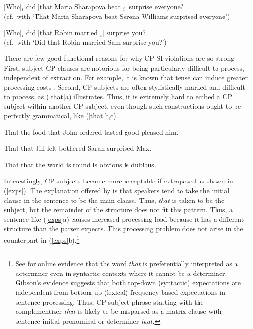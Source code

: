 \documentclass[output=paper]{langsci/langscibook}
\begin{document}
\ea
\ea \bad{*}[Who]$_i$ did [that Maria Sharapova beat \spc$_i$] surprise everyone?\\
(cf.\ with `That Maria Sharapova beat Serena Williams surprised everyone')

\ex \bad{*}[Who]$_i$ did [that Robin married \spc$_i$] surprise you?\\
(cf.\ with `Did that Robin married Sam surprise you?')
\z \label{ssc}
\z

%



There are  few good functional reasons for why CP SI violations are so strong. First, subject CP clauses are notorious for being particularly difficult to process, independent of extraction. For example, it is known that tense can induce greater processing costs
 \citep{kluender92,gibson0000}. Second, CP  subjects  are often  stylistically marked and difficult  to process,   as  (\ref{that}a) illustrates. Thus, it is extremely hard to embed a CP subject within another CP subject, even though such constructions ought to be perfectly grammatical,  like (\ref{that}b,c). 

\ea
\ea That the food that John ordered tasted good pleased him.\\
\citep{cowper76,gibson91}

\ex \bad{*}That that Jill left bothered Sarah surprised Max.\\
\citep{kimball}
 
 \ex \bad{*}That that the world is round is obvious is dubious.\\
\citep{kuno74}
\z \label{that}
\z



 Interestingly, CP subjects become more acceptable if  extraposed as shown in (\ref{exps}).
The explanation offered by  \citet[356--357]{fod74} is that speakers tend to  take the initial clause in the sentence  to be the  main clause. Thus, \emph{that} is taken to be the subject, but the remainder
of the structure does not fit this pattern. Thus, a sentence like (\ref{exps}a) causes
 increased  processing  load  because  it has a  different structure 
than the parser expects.
This processing problem does not arise
in the counterpart in (\ref{exps}b).\footnote{See  \citet{gibson07} for online evidence
that  the word \emph{that} is preferentially interpreted as a determiner even in syntactic contexts where it cannot be a determiner. 
 Gibson's evidence suggests that both top-down (syntactic) expectations are independent from bottom-up (lexical) frequency-based expectations in sentence processing. Thus, 
CP subject phrase  starting with the complementizer
\emph{that} is likely to be misparsed as a matrix clause with sentence-initial  pronominal or determiner \emph{that}.}
\end{document}
